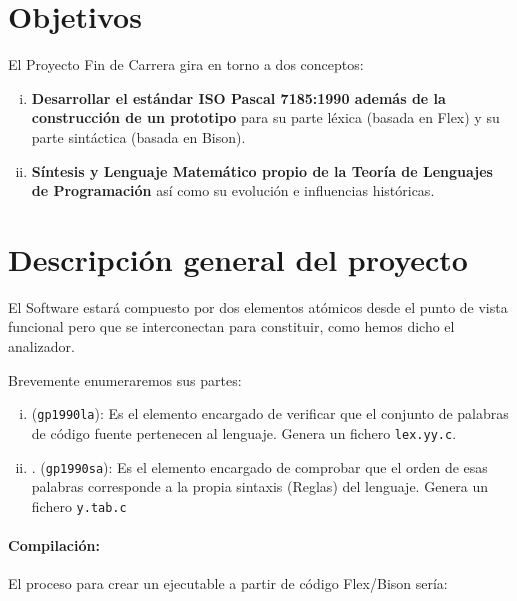 
\label{chap:cap2}

\section{Objetivos}

El Proyecto Fin de Carrera  gira en torno a dos conceptos:

\begin{enumerate}[i.]

\item \textbf{Desarrollar el estándar ISO Pascal 
7185:1990
además de la construcción de un prototipo} para su parte léxica (basada en 
Flex) y su
parte sintáctica (basada en Bison).

\item \textbf{Síntesis y Lenguaje Matemático propio de la Teoría de Lenguajes de
Programación} así como su evolución e influencias históricas.

\end{enumerate}

\section{Descripción general del proyecto}

El Software estará compuesto por dos elementos atómicos desde el punto de
vista funcional pero que se interconectan para constituir, como hemos dicho el
analizador.

Brevemente enumeraremos sus partes:

\begin{enumerate}[i.]
\item {} ({\tt gp1990la}): Es el elemento encargado de verificar
que el conjunto de palabras de código fuente pertenecen al lenguaje. Genera un 
fichero \texttt{lex.yy.c}.
\item {} .  ({\tt gp1990sa}): Es
el elemento encargado de
comprobar que el orden de esas palabras corresponde a la propia sintaxis 
(Reglas)
del lenguaje. Genera un fichero \texttt{y.tab.c}
\end{enumerate}

\paragraph*{Compilación:} El proceso para crear un ejecutable a partir de código Flex/Bison sería:

